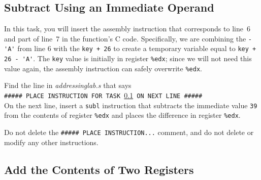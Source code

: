 \subsection{Subtract Using an Immediate Operand}\label{task1}

In this task, you will insert the assembly instruction that corresponds to
line~6 and part of line~7 in the function's C code. Specifically, we are
combining the \lstinline{-'A'} from line 6 with the \lstinline{key + 26} to
create a temporary variable equal to \lstinline{key + 26 - 'A'}. The
\lstinline{key} value is initially in register \lstinline{%edx}; since we will
not need this value again, the assembly instruction can safely overwrite
\lstinline{%edx}.

Find the line in \textit{addressinglab.s} that says \\
\texttt{\#\#\#\#\# PLACE INSTRUCTION FOR TASK \ref{task1} ON NEXT LINE \#\#\#\#\#} \\
On the next line, insert a \lstinline{subl} instruction that subtracts the
immediate value \lstinline{39} from the contents of register \lstinline{%edx}
and places the difference in register \lstinline{%edx}.


Do not delete the \texttt{\#\#\#\#\# PLACE INSTRUCTION...} comment, and do not
delete or modify any other instructions.

%
%
%
%

\subsection{Add the Contents of Two Registers}\label{task3}

